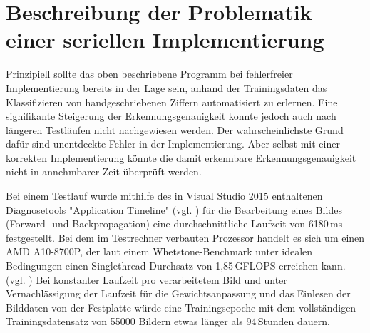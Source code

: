 \documentclass[../main.tex]{subfiles}
\begin{document}
\section{Beschreibung der Problematik einer seriellen Implementierung}
Prinzipiell sollte das oben beschriebene Programm bei fehlerfreier Implementierung bereits in der Lage sein, anhand der Trainingsdaten das Klassifizieren von handgeschriebenen Ziffern automatisiert zu erlernen. Eine signifikante Steigerung der Erkennungsgenauigkeit konnte jedoch auch nach längeren Testläufen nicht nachgewiesen werden. Der wahrscheinlichste Grund dafür sind unentdeckte Fehler in der Implementierung. Aber selbst mit einer korrekten Implementierung könnte die damit erkennbare Erkennungsgenauigkeit nicht in annehmbarer Zeit überprüft werden. 

Bei einem Testlauf wurde mithilfe des in Visual Studio 2015 enthaltenen Diagnosetools "Application Timeline" (vgl. \cite{msVsDiagnosisBlog}) für die Bearbeitung eines Bildes (Forward- und Backpropagation) eine durchschnittliche Laufzeit von 6180\,ms festgestellt. Bei dem im Testrechner verbauten Prozessor handelt es sich um einen AMD A10-8700P, der laut einem Whetstone-Benchmark unter idealen Bedingungen einen Singlethread-Durchsatz von 1,85\,GFLOPS erreichen kann. (vgl. \cite{cpuSinglethreadBenchmark}) Bei konstanter Laufzeit pro verarbeitetem Bild und unter Vernachlässigung der Laufzeit für die Gewichtsanpassung und das Einlesen der Bilddaten von der Festplatte würde eine Trainingsepoche mit dem vollständigen Trainingsdatensatz von 55000 Bildern etwas länger als 94\,Stunden dauern. 
\end{document}
